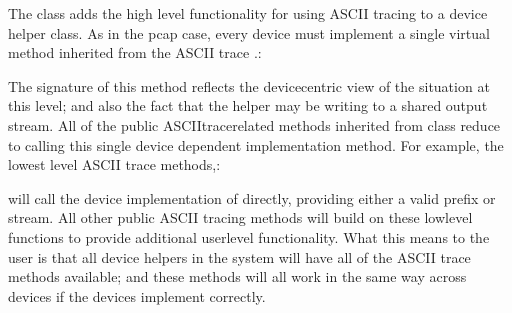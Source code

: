 \documentclass[letterpaper,10pt,english]{sphinxmanual}
\renewcommand{\sphinxcode}[1]{\texttt{\small{#1}}}
\begin{document}
The class \sphinxcode{} adds the high level functionality for
using ASCII tracing to a device helper class. As in the pcap case, every device
must implement a single virtual method inherited from the ASCII trace
\sphinxcode{}.:

\begin{sphinxVerbatim}[commandchars=\\\{\}]
          
\end{sphinxVerbatim}

The signature of this method reflects the device\sphinxhyphen{}centric view of the situation
at this level; and also the fact that the helper may be writing to a shared
output stream. All of the public ASCII\sphinxhyphen{}trace\sphinxhyphen{}related methods inherited from
class \sphinxcode{} reduce to calling this single device\sphinxhyphen{}
dependent implementation method. For example, the lowest level ASCII trace
methods,:

\begin{sphinxVerbatim}[commandchars=\\\{\}]
     
     
\end{sphinxVerbatim}

will call the device implementation of \sphinxcode{} directly,
providing either a valid prefix or stream.  All other public ASCII tracing
methods will build on these low\sphinxhyphen{}level functions to provide additional user\sphinxhyphen{}level
functionality. What this means to the user is that all device helpers in the
system will have all of the ASCII trace methods available; and these methods
will all work in the same way across devices if the devices implement
\sphinxcode{} correctly.
\end{document}
